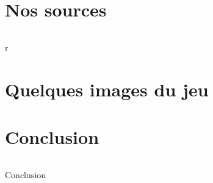 \documentclass[titlepage, 13px, a4paper]{report}
\begin{document}
\newpage


\part{Nos sources}
\paragraph{} \hspace{0pt}
r


\newpage


\part{Quelques images du jeu}



\newpage


\part{Conclusion}
\paragraph{} \hspace{0pt}
Conclusion

\end{document}
